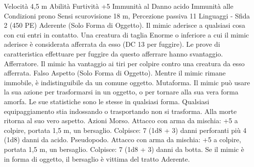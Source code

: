 \begin{multicols}{2}
Velocità 4,5 m
Abilità Furtività +5
Immunità al Danno acido
Immunità alle Condizioni prono
Sensi scurovisione 18 m, Percezione passiva 11
Linguaggi -
Sfida 2 (450 PE)
Aderente (Solo Forma di Oggetto). Il mimic aderisce a qualsiasi
cosa con cui entri in contatto. Una creatura di taglia Enorme o
inferiore a cui il mimic aderisce è considerata afferrata da esso
(DC 13 per fuggire). Le prove di caratteristica effettuare per
fuggire da questo afferrare hanno svantaggio.
Afferratore. Il mimic ha vantaggio ai tiri per colpire contro una
creatura da esso afferrata.
Falso Aspetto (Solo Forma di Oggetto). Mentre il mimic rimane
immobile, è indistinguibile da un comune oggetto.
Mutaforma. Il mimic può usare la sua azione per trasformarsi in
un oggetto, o per tornare alla sua vera forma amorfa. Le sue
statistiche sono le stesse in qualsiasi forma. Qualsiasi
equipaggiamento stia indossando o trasportando non si
trasforma. Alla morte ritorna al suo vero aspetto.
Azioni
Morso. Attacco con arma da mischia: +5 a colpire, portata 1,5
m, un bersaglio.
Colpisce: 7 (1d8 + 3) danni perforanti più 4 (1d8) danni da
acido.
Pseudopodo. Attacco con arma da mischia: +5 a colpire, portata
1,5 m, un bersaglio.
Colpisce: 7 (1d8 + 3) danni da botta. Se il mimic è in forma
di oggetto, il bersaglio è vittima del tratto Aderente.
 

\end{multicols}

